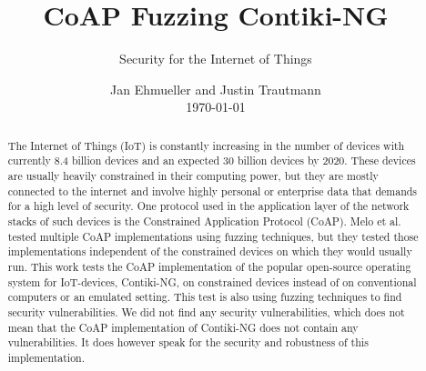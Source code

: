 \documentclass[sigconf]{acmart}
\begin{document}
\title{CoAP Fuzzing Contiki-NG}
\subtitle{Security for the Internet of Things}

\author{Jan Ehmueller and Justin Trautmann \\ \today}

\begin{abstract}
The Internet of Things (IoT) is constantly increasing in the number of devices with currently 8.4 billion devices and an expected 30 billion devices by 2020. These devices are usually heavily constrained in their computing power, but they are mostly connected to the internet and involve highly personal or enterprise data that demands for a high level of security. One protocol used in the application layer of the network stacks of such devices is the Constrained Application Protocol (CoAP).
Melo et al.~\cite{Melo2017RobustnessTO} tested multiple CoAP implementations using fuzzing techniques, but they tested those implementations independent of the constrained devices on which they would usually run. This work tests the CoAP implementation of the popular open-source operating system for IoT-devices, Contiki-NG, on constrained devices instead of on conventional computers or an emulated setting. This test is also using fuzzing techniques to find security vulnerabilities.
We did not find any security vulnerabilities, which does not mean that the CoAP implementation of Contiki-NG does not contain any vulnerabilities. It does however speak for the security and robustness of this implementation.
\end{abstract}

\maketitle

\glsresetall









\balance



\end{document}

